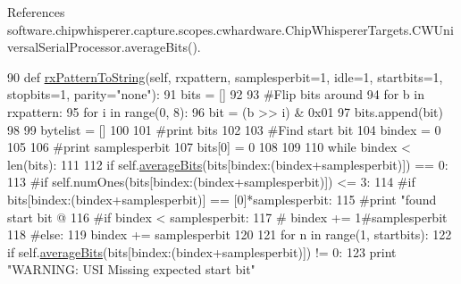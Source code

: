 References software.\+chipwhisperer.\+capture.\+scopes.\+cwhardware.\+Chip\+Whisperer\+Targets.\+C\+W\+Universal\+Serial\+Processor.\+average\+Bits().


\begin{DoxyCode}
90     \textcolor{keyword}{def }\hyperlink{classsoftware_1_1chipwhisperer_1_1capture_1_1scopes_1_1cwhardware_1_1ChipWhispererTargets_1_1CWUniversalSerialProcessor_ae9d3a515864c14c7b71a647d88454f6b}{rxPatternToString}(self, rxpattern, samplesperbit=1, idle=1, startbits=1, 
      stopbits=1, parity="none"):
91         bits = []
92         
93         \textcolor{comment}{#Flip bits around}
94         \textcolor{keywordflow}{for} b \textcolor{keywordflow}{in} rxpattern:
95             \textcolor{keywordflow}{for} i \textcolor{keywordflow}{in} range(0,  8):
96                 bit = (b >> i) & 0x01
97                 bits.append(bit)
98             
99         bytelist = []
100         
101         \textcolor{comment}{#print bits}
102                 
103         \textcolor{comment}{#Find start bit}
104         bindex = 0
105         
106         \textcolor{comment}{#print samplesperbit}
107         bits[0] = 0
108         
109         
110         \textcolor{keywordflow}{while} bindex < len(bits):
111             
112             \textcolor{keywordflow}{if} self.\hyperlink{classsoftware_1_1chipwhisperer_1_1capture_1_1scopes_1_1cwhardware_1_1ChipWhispererTargets_1_1CWUniversalSerialProcessor_a6c440a6340a95a9c8a76e99795c412f4}{averageBits}(bits[bindex:(bindex+samplesperbit)]) == 0:
113             \textcolor{comment}{#if self.numOnes(bits[bindex:(bindex+samplesperbit)]) <= 3:}
114             \textcolor{comment}{#if bits[bindex:(bindex+samplesperbit)] == [0]*samplesperbit:                }
115                 \textcolor{comment}{#print "found start bit @ %
116                 \textcolor{comment}{#if bindex < samplesperbit:}
117                 \textcolor{comment}{#    bindex += 1#samplesperbit}
118                 \textcolor{comment}{#else:               }
119                 bindex += samplesperbit
120                 
121                 \textcolor{keywordflow}{for} n \textcolor{keywordflow}{in} range(1, startbits):
122                     \textcolor{keywordflow}{if} self.\hyperlink{classsoftware_1_1chipwhisperer_1_1capture_1_1scopes_1_1cwhardware_1_1ChipWhispererTargets_1_1CWUniversalSerialProcessor_a6c440a6340a95a9c8a76e99795c412f4}{averageBits}(bits[bindex:(bindex+samplesperbit)]) != 0:
123                         \textcolor{keywordflow}{print} \textcolor{stringliteral}{"WARNING: USI Missing expected start bit"}
}
\end{DoxyCode}
